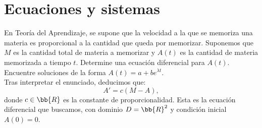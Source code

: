 \section{Ecuaciones y sistemas}

\begin{ejercicio}
    En Teoría del Aprendizaje, se supone que la velocidad a la que se memoriza una materia es proporcional a la
    cantidad que queda por memorizar. Suponemos que \(M\) es la cantidad total de materia a memorizar y \(A(t)\) es la
    cantidad de materia memorizada a tiempo \(t\). Determine una ecuación diferencial para \(A(t)\). Encuentre soluciones
    de la forma \(A(t) = a + be^{\lambda t}\).\\

    Tras interpretar el enunciado, deducimos que:
    \begin{equation*}
        A' = c(M - A),
    \end{equation*}
    donde $c\in \bb{R}$ es la constante de proporcionalidad.    
    Esta es la ecuación diferencial que buscamos, con dominio $D=\bb{R}^2$ y condición inicial $A(0)=0$.

\end{ejercicio}


